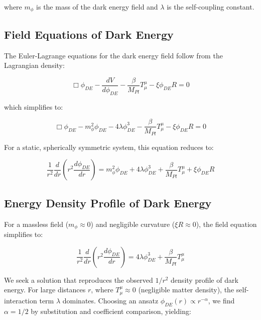 \documentclass[a4paper,12pt]{article}
\begin{document}
where $m_{\phi}$ is the mass of the dark energy field and $\lambda$ is the self-coupling constant.

\subsection{Field Equations of Dark Energy}

The Euler-Lagrange equations for the dark energy field follow from the Lagrangian density:

\begin{equation}
	\Box\phi_{DE} - \frac{dV}{d\phi_{DE}} - \frac{\beta}{M_{Pl}}T^{\mu}_{\mu} - \xi \phi_{DE} R = 0
\end{equation}

which simplifies to:

\begin{equation}
	\Box\phi_{DE} - m_{\phi}^2\phi_{DE} - 4\lambda\phi_{DE}^3 - \frac{\beta}{M_{Pl}}T^{\mu}_{\mu} - \xi \phi_{DE} R = 0
\end{equation}

For a static, spherically symmetric system, this equation reduces to:

\begin{equation}
	\frac{1}{r^2}\frac{d}{dr}\left(r^2\frac{d\phi_{DE}}{dr}\right) = m_{\phi}^2\phi_{DE} + 4\lambda\phi_{DE}^3 + \frac{\beta}{M_{Pl}}T^{\mu}_{\mu} + \xi \phi_{DE} R
\end{equation}

\subsection{Energy Density Profile of Dark Energy}

For a massless field ($m_{\phi} \approx 0$) and negligible curvature ($\xi R \approx 0$), the field equation simplifies to:

\begin{equation}
	\frac{1}{r^2}\frac{d}{dr}\left(r^2\frac{d\phi_{DE}}{dr}\right) = 4\lambda\phi_{DE}^3 + \frac{\beta}{M_{Pl}}T^{\mu}_{\mu}
\end{equation}

We seek a solution that reproduces the observed $1/r^2$ density profile of dark energy. For large distances $r$, where $T^{\mu}_{\mu} \approx 0$ (negligible matter density), the self-interaction term $\lambda$ dominates. Choosing an ansatz $\phi_{DE}(r) \propto r^{-\alpha}$, we find $\alpha = 1/2$ by substitution and coefficient comparison, yielding:
\end{document}
